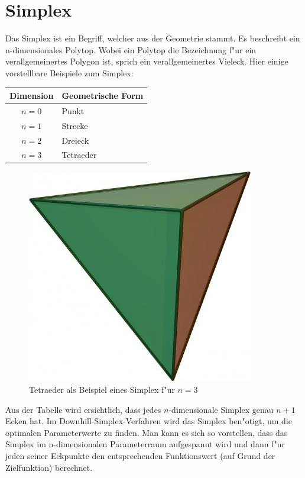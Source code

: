 \section{Simplex}
Das Simplex ist ein Begriff, welcher aus der Geometrie stammt. Es beschreibt ein n-dimensionales Polytop. Wobei ein Polytop die Bezeichnung f"ur ein verallgemeinertes Polygon ist, sprich ein verallgemeinertes Vieleck. 
Hier einige vorstellbare Beispiele zum Simplex:
 
\begin{tabular}{c|l}
Dimension & Geometrische Form\\
\hline
$n=0$ & Punkt\\
$n=1$ & Strecke\\
$n=2$ & Dreieck\\
$n=3$ & Tetraeder
\end{tabular}

\begin{figure}
\centering
\includegraphics[height=0.25\textwidth]{../bilder/tetraeder.jpg}
\caption{Tetraeder als Beispiel eines Simplex f"ur $n=3$}
\end{figure}

Aus der Tabelle wird ersichtlich, dass jedes $n$-dimensionale Simplex genau $n+1$ Ecken hat.
Im Downhill-Simplex-Verfahren wird das Simplex ben"otigt, um die optimalen Parameterwerte zu finden. Man kann es sich so vorstellen, dass das Simplex im n-dimensionalen Parameterraum aufgespannt wird und dann f"ur jeden seiner Eckpunkte den entsprechenden Funktionswert (auf Grund der Zielfunktion) berechnet.

